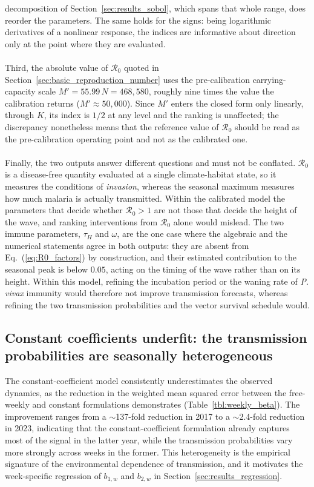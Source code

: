 \documentclass[a4paper,fleqn]{cas-dc}
\begin{document}
decomposition of Section~\ref{sec:results_sobol}, which spans that whole
range, does reorder the parameters. The same
holds for the signs: being logarithmic derivatives of a nonlinear
response, the indices are informative about direction only at the point
where they are evaluated.
\\\\
Third, the absolute value of $\mathcal{R}_0$ quoted in
Section~\ref{sec:basic_reproduction_number} uses the pre-calibration
carrying-capacity scale $M' = 55.99\,N = 468{,}580$, roughly nine times
the value the calibration returns ($M' \approx 50{,}000$). Since $M'$
enters the closed form only linearly, through $K$, its index is $1/2$ at
any level and the ranking is unaffected; the discrepancy nonetheless
means that the reference value of $\mathcal{R}_0$ should be read as the
pre-calibration operating point and not as the calibrated one.
\\\\
Finally, the two outputs answer different questions and must not be
conflated. $\mathcal{R}_0$ is a disease-free quantity evaluated at a
single climate-habitat state, so it measures the conditions of
\emph{invasion}, whereas the seasonal maximum measures how much malaria
is actually transmitted. Within the calibrated model the parameters that
decide whether $\mathcal{R}_0 > 1$ are not those that decide the height
of the wave, and ranking interventions from $\mathcal{R}_0$ alone would
mislead. The two immune parameters, $\tau_H$ and $\omega$, are the one case where the algebraic
and the numerical statements agree in both outputs: they are absent from
Eq.~(\ref{eq:R0_factors}) by construction, and their estimated
contribution to the seasonal peak is below $0.05$, acting on the timing
of the wave rather than on its height. Within this model, refining the
incubation period or the waning rate of \textit{P. vivax} immunity
would therefore not improve transmission forecasts, whereas refining the
two transmission probabilities and the vector survival schedule would.

\subsection{Constant coefficients underfit: the transmission
probabilities are seasonally heterogeneous}
\label{sec:constant_coeff_underfit}

The constant-coefficient model consistently underestimates the
observed dynamics, as the reduction in the weighted mean squared error
between the free-weekly and constant formulations demonstrates
(Table~\ref{tbl:weekly_beta}). The improvement ranges from a
$\sim$137-fold reduction in 2017 to a $\sim$2.4-fold reduction in
2023, indicating that the constant-coefficient formulation already
captures most of the signal in the latter year, while the transmission
probabilities vary more strongly across weeks in the former. This
heterogeneity is the empirical signature of the environmental
dependence of transmission, and it motivates the week-specific
regression of $b_{1,w}$ and $b_{2,w}$ in
Section~\ref{sec:results_regression}.
\end{document}
